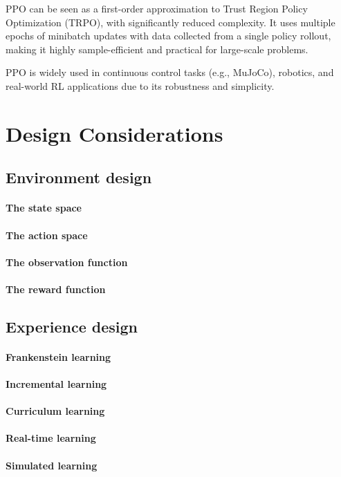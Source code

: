 \vspace{0.5em}
PPO can be seen as a first-order approximation to Trust Region Policy Optimization (TRPO), with significantly reduced complexity. It uses multiple epochs of minibatch updates with data collected from a single policy rollout, making it highly sample-efficient and practical for large-scale problems.

\vspace{0.5em}
PPO is widely used in continuous control tasks (e.g., MuJoCo), robotics, and real-world RL applications due to its robustness and simplicity.

\section{Design Considerations}

\subsection{Environment design}

\paragraph{The state space}

\paragraph{The action space}

\paragraph{The observation function}

\paragraph{The reward function}

\subsection{Experience design}

\paragraph{Frankenstein learning}

\paragraph{Incremental learning}

\paragraph{Curriculum learning}

\paragraph{Real-time learning}

\paragraph{Simulated learning}
